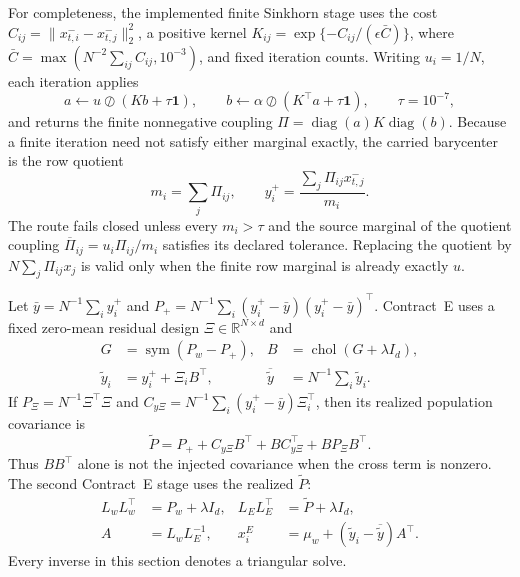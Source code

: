 For completeness, the implemented finite Sinkhorn stage uses the cost
\(C_{ij}=\lVert x_{t,i}^{-}-x_{t,j}^{-}\rVert_2^2\), a positive kernel
\(K_{ij}=\exp\{-C_{ij}/(\epsilon\bar C)\}\), where
\(\bar C=\max(N^{-2}\sum_{ij}C_{ij},10^{-3})\), and fixed iteration counts.
Writing \(u_i=1/N\), each iteration applies
\begin{equation}
 a\leftarrow u\oslash(Kb+\tau\mathbf1),
 \qquad
 b\leftarrow\alpha\oslash(K^\top a+\tau\mathbf1),
 \qquad \tau=10^{-7},
 \label{eq:bf-eot-hm-sinkhorn}
\end{equation}
and returns the finite nonnegative coupling
\(\Pi=\operatorname{diag}(a)K\operatorname{diag}(b)\).  Because a finite
iteration need not satisfy either marginal exactly, the carried barycenter is
the row quotient
\begin{equation}
 m_i=\sum_j\Pi_{ij},
 \qquad
 y_i^+=\frac{\sum_j\Pi_{ij}x_{t,j}^{-}}{m_i}.
 \label{eq:bf-eot-hm-barycentric}
\end{equation}
The route fails closed unless every \(m_i>\tau\) and the source marginal of
the quotient coupling
\(\overline\Pi_{ij}=u_i\Pi_{ij}/m_i\) satisfies its declared tolerance.
Replacing the quotient by \(N\sum_j\Pi_{ij}x_j\) is valid only when the finite
row marginal is already exactly \(u\).

Let \(\bar y=N^{-1}\sum_i y_i^+\) and
\(P_+=N^{-1}\sum_i(y_i^+-\bar y)(y_i^+-\bar y)^\top\).  Contract~E uses a
fixed zero-mean residual design \(\Xi\in\mathbb R^{N\times d}\) and
\begin{align}
 G&=\operatorname{sym}(P_w-P_+),
 &B&=\operatorname{chol}(G+\lambda I_d),\\
 \widetilde y_i&=y_i^++\Xi_iB^\top,
 &\overline{\widetilde y}&=N^{-1}\sum_i\widetilde y_i.
 \label{eq:bf-eot-hm-residual}
\end{align}
If \(P_\Xi=N^{-1}\Xi^\top\Xi\) and
\(C_{y\Xi}=N^{-1}\sum_i(y_i^+-\bar y)\Xi_i^\top\), then its realized
population covariance is
\begin{equation}
 \widetilde P=P_++C_{y\Xi}B^\top+BC_{y\Xi}^\top+BP_\Xi B^\top.
 \label{eq:bf-eot-hm-cross-covariance}
\end{equation}
Thus \(BB^\top\) alone is not the injected covariance when the cross term is
nonzero.  The second Contract~E stage uses the realized \(\widetilde P\):
\begin{align}
 L_wL_w^\top&=P_w+\lambda I_d,
 &L_EL_E^\top&=\widetilde P+\lambda I_d,\\
 A&=L_wL_E^{-1},
 &x_i^E&=\mu_w+(\widetilde y_i-\overline{\widetilde y})A^\top.
 \label{eq:bf-eot-hm-contract-e}
\end{align}
Every inverse in this section denotes a triangular solve.

